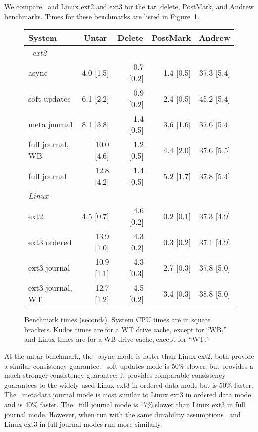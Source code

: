 \newcommand{\benchtable}{
\begin{figure}[tb]
\centering
\small
\begin{tabular}{@{}lrrrr@{}}
\textbf{System} & \multicolumn{1}{c}{\textbf{Untar}} & \multicolumn{1}{c}{\textbf{Delete}} & \multicolumn{1}{c}{\textbf{PostMark}} & \multicolumn{1}{c}{\textbf{Andrew}} \\ \hline
\emph{\Kudos\ ext2} & & & & \\
async & 4.0 [1.5] & 0.7 [0.2] & 1.4 [0.5] & 37.3 [5.4] \\
soft updates & 6.1 [2.2] & 0.9 [0.2] & 2.4 [0.5] & 45.2 [5.4] \\
meta journal & 8.1 [3.8] & 1.4 [0.5] & 3.6 [1.6] & 37.6 [5.4] \\
full journal, WB & 10.0 [4.6] & 1.2 [0.5] & 4.4 [2.0] & 37.6 [5.5] \\
full journal & 12.8 [4.2] & 1.4 [0.5] & 5.2 [1.7] & 37.8 [5.4] \\ \hline


\emph{Linux} & & & & \\
ext2 & 4.5 [0.7] & 4.6 [0.2] & 0.2 [0.1] & 37.3 [4.9] \\
ext3 ordered & 13.9 [1.0] & 4.3 [0.2] & 0.3 [0.2] & 37.1 [4.9] \\
ext3 journal & 10.9 [1.1] & 4.3 [0.3] & 2.7 [0.3] & 37.8 [5.0] \\
ext3 journal, WT & 12.7 [1.2] & 4.5 [0.2] & 3.4 [0.3] & 38.8 [5.0] \\
\end{tabular}
\caption{\label{fig:bench_time} Benchmark times (seconds). System CPU
  times are in square brackets.  Kudos times are for a WT drive cache,
  except for ``WB,'' and Linux times are for a WB drive cache, except
  for ``WT.''}
\end{figure}
}

We compare \Kudos\ and Linux ext2 and ext3 for the tar, delete,
PostMark, and Andrew benchmarks. Times for these benchmarks are listed
in Figure~\ref{fig:bench_time}.

\benchtable{}

At the untar benchmark, the \Kudos\ async mode is faster than Linux
ext2, both provide a similar consistency guarantee.
%
\Kudos\ soft updates mode is 50\% slower, but provides a much stronger
consistency guarantee; it provides comparable consistency guarantees
to the widely used Linux ext3 in ordered data mode but is 50\% faster.
%
The \Kudos\ metadata journal mode is most similar to Linux ext3 in
ordered data mode and is 40\% faster.
%
The \Kudos\ full journal mode is 17\% slower than Linux ext3 in full
journal mode.
%
However, when run with the same durability assumptions \Kudos\ and
Linux ext3 in full journal modes run more similarly.

